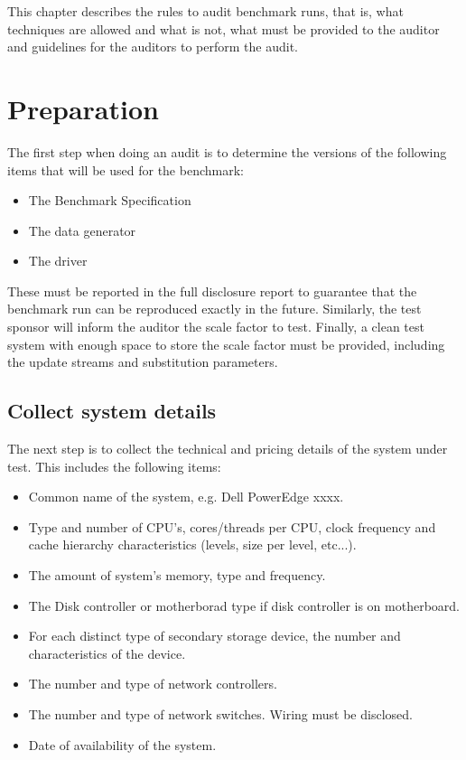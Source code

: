 

This chapter describes the rules to audit benchmark runs, that is, what
techniques are allowed and what is not, what must be provided to the auditor
and guidelines for the auditors to perform the audit. 

\section{Preparation}

The first step when doing an audit is to determine the versions of the
following items that will be used for the benchmark:

\begin{itemize}
  \item The Benchmark Specification
  \item The data generator
  \item The driver
\end{itemize}

These must be reported in the full disclosure report to guarantee that the
benchmark run can be reproduced exactly in the future. Similarly, the test
sponsor will inform the auditor the scale factor to test. Finally, a clean test
system with enough space to store the scale factor must be provided, including
the update streams and substitution parameters. 


\subsection{Collect system details}

The next step is to collect the technical and pricing details of the system
under test. This includes the following items:

\begin{itemize}
\item Common name of the system, e.g. Dell PowerEdge xxxx.
\item Type and number of CPU's, cores/threads per CPU, clock frequency and cache hierarchy characteristics (levels, size per level, etc...).
\item The amount of system's memory, type and frequency.
\item The Disk controller or motherborad type if disk controller is on motherboard.
\item For each distinct type of secondary storage device, the number and characteristics of the device.
\item The number and type of network controllers.
\item The number and type of network switches. Wiring must be disclosed.
\item Date of availability of the system.
\end{itemize}

